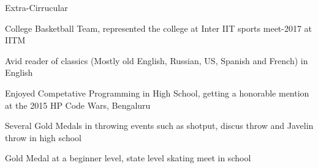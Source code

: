 \documentclass{resume} %
\begin{document}
\begin{rSection}{Extra-Cirrucular} %

\item College Basketball Team, represented the college at Inter IIT sports meet-2017 at IITM 

\item Avid reader of classics (Mostly old English, Russian, US, Spanish and French) in English
\item Enjoyed Competative Programming in High School, getting a honorable mention at the 2015 HP Code Wars, Bengaluru
\item Several Gold Medals in throwing events such as shotput, discus throw and Javelin throw in high school
\item Gold Medal at a beginner level, state level skating meet in school

\end{rSection}
\end{document}
